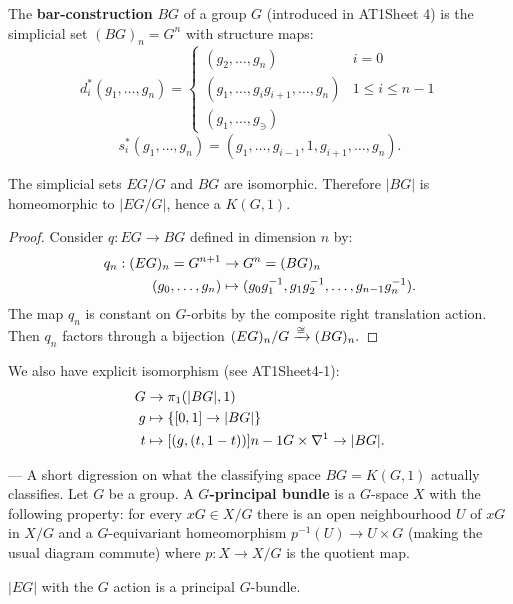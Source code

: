 \begin{remark}
The \textbf{bar-construction} $BG$ of a group $G$ (introduced in AT1Sheet 4) is the simplicial set $(BG)_n=G^n$ with structure maps:
\[d^*_i(g_1,\dots,g_n)=\begin{cases}
(g_2,\dots,g_n) & i=0\\
(g_1,\dots,g_ig_{i+1},\dots,g_n) & 1\leq i\leq n-1\\
(g_1,\dots,g_\ni)
\end{cases}\]
\[s^*_i(g_1,\dots,g_n)=(g_1,\dots,g_{i-1},1,g_{i+1},\dots,g_n).\]

\begin{lemma}
The simplicial sets $EG/G$ and $BG$ are isomorphic. Therefore $|BG|$ is homeomorphic to $|EG/G|$, hence a $K(G,1)$.
\end{lemma}

\begin{proof}
Consider $q:EG\to BG$ defined in dimension $n$ by:
\begin{align*}
    q_n:(EG)_n=G^{n+1}&\to G^n=(BG)_n\\
    ({{g}_0,\dots,{g}_{n}})&\mapsto(g_0g_1^{-1},g_1g_2^{-1},\dots,g_{n-1} g_n^{-1}).
\end{align*}
The map $q_n$ is constant on $G$-orbits by the composite right translation action. Then $q_n$ factors through a bijection $(EG)_n/G\xrightarrow{\cong}(BG)_n.$
\end{proof}
\end{remark}

We also have explicit isomorphism (see AT1Sheet4-1):
\begin{align*}
    G&\to\pi_1(|BG|,1)\\
    g&\mapsto\cb{[0,1]\to|BG|}\\
    t&\mapsto[(g,(t,1-t))]\cont G\times\sx{1}\to|BG|.
\end{align*}

 --- A short digression on what the classifying space $BG=K(G,1)$ actually classifies. Let $G$ be a group. A \textbf{$G$-principal bundle} is a $G$-space $X$ with the following property: for every $xG\in X/G$ there is an open neighbourhood $U$ of $xG$ in $X/G$ and a $G$-equivariant homeomorphism $p^{-1}(U)\to U\times G$ (making the usual diagram commute) where $p:X\to X/G$ is the quotient map.

\begin{example}
$|EG|$ with the $G$ action is a principal $G$-bundle.
\end{example}


